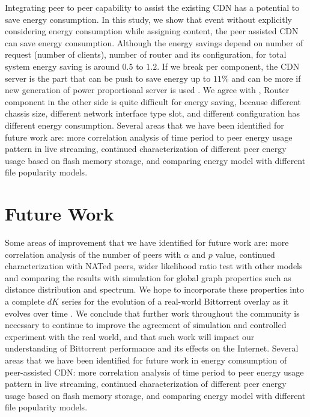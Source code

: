 Integrating peer to peer capability to assist the existing CDN has a potential to save energy consumption.
In this study, we show that event without explicitly considering energy consumption while assigning content, the peer assisted CDN can save energy consumption.
Although the energy savings depend on number of request (number of clients), number of router and its configuration, for total system energy saving is around $0.5$ to $1.2$.
If we break per component, the CDN server is the part that can be push to save energy up to $11\%$ and can be more if new generation of power proportional server is used \cite{Krioukov:2011:NDI:1925861.1925878}.
We agree with \cite{4509688}, Router component in the other side is quite difficult for energy saving, because different chassis size, different network interface type slot, and different configuration has different energy consumption.
Several areas that we have been identified for future work are: more correlation analysis of time period to peer energy usage pattern in live streaming, continued characterization of different peer energy usage based on flash memory storage, and comparing energy model with different file popularity models.


\section{Future Work}
Some areas of improvement that we have identified for future work are: more correlation analysis of the number of peers with $\alpha$ and $p$ value, continued characterization with NATed peers, wider likelihood ratio test with other models and comparing the results with simulation for global graph properties such as distance distribution and spectrum.
We hope to incorporate these properties into a complete $dK$ series for the evolution of a real-world Bittorrent overlay as it evolves over time \cite{mahadevan2006systematic}. 
We conclude that further work throughout the community is necessary to continue to improve the agreement of simulation and controlled experiment with the real world, and that such work will impact our understanding of Bittorrent performance and its effects on the Internet.
Several areas that we have been identified for future work in energy comsumption of peer-assisted CDN: more correlation analysis of time period to peer energy usage pattern in live streaming, continued characterization of different peer energy usage based on flash memory storage, and comparing energy model with different file popularity models.